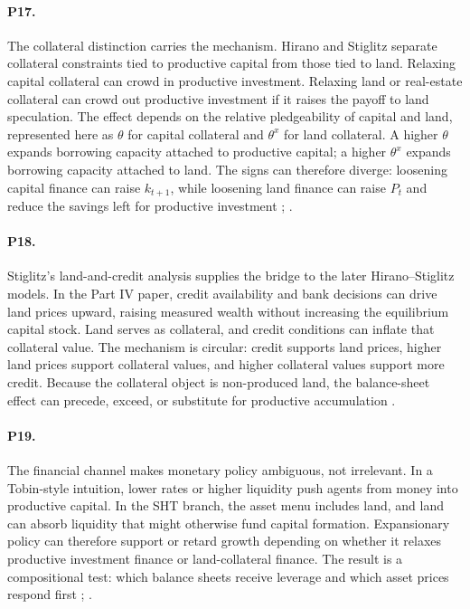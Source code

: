 \documentclass[11pt]{article}
\begin{document}
\paragraph{P17.} The collateral distinction carries the mechanism. Hirano and Stiglitz separate collateral constraints tied to productive capital from those tied to land. Relaxing capital collateral can crowd in productive investment. Relaxing land or real-estate collateral can crowd out productive investment if it raises the payoff to land speculation. The effect depends on the relative pledgeability of capital and land, represented here as \(\theta\) for capital collateral and \(\theta^x\) for land collateral. A higher \(\theta\) expands borrowing capacity attached to productive capital; a higher \(\theta^x\) expands borrowing capacity attached to land. The signs can therefore diverge: loosening capital finance can raise \(k_{t+1}\), while loosening land finance can raise \(P_t\) and reduce the savings left for productive investment \citep[pp.~4, 7, 10, 15, 33, 38]{hiranoStiglitz2024CreditLandGrowth}; \citep[pp.~1--2, 16--17, 19, 29]{hiranoStiglitz2025LowInterestPolicy}.

\paragraph{P18.} Stiglitz's land-and-credit analysis supplies the bridge to the later Hirano--Stiglitz models. In the Part IV paper, credit availability and bank decisions can drive land prices upward, raising measured wealth without increasing the equilibrium capital stock. Land serves as collateral, and credit conditions can inflate that collateral value. The mechanism is circular: credit supports land prices, higher land prices support collateral values, and higher collateral values support more credit. Because the collateral object is non-produced land, the balance-sheet effect can precede, exceed, or substitute for productive accumulation \citep[pp.~16--18]{stiglitz2015LandCredit}.

\paragraph{P19.} The financial channel makes monetary policy ambiguous, not irrelevant. In a Tobin-style intuition, lower rates or higher liquidity push agents from money into productive capital. In the SHT branch, the asset menu includes land, and land can absorb liquidity that might otherwise fund capital formation. Expansionary policy can therefore support or retard growth depending on whether it relaxes productive investment finance or land-collateral finance. The result is a compositional test: which balance sheets receive leverage and which asset prices respond first \citep[pp.~1--4]{hiranoStiglitz2025LowInterestPolicy}; \citep[pp.~1, 15, 33, 38]{hiranoStiglitz2024CreditLandGrowth}.
\end{document}
